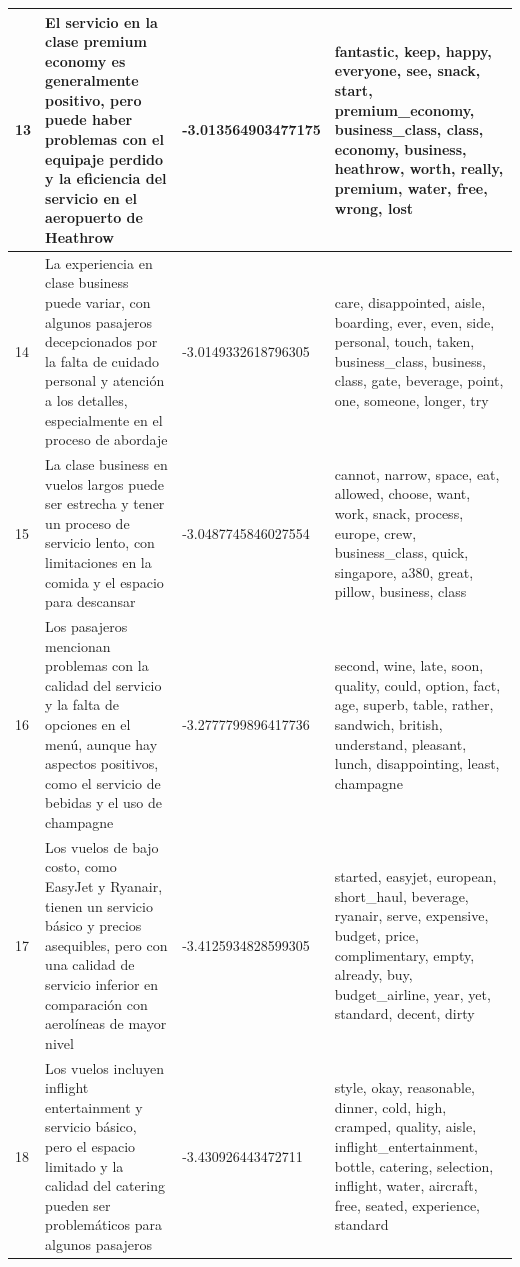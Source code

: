 \documentclass{report}
\begin{document}
\begin{longtable}{|p{1cm}|p{4cm}|p{4cm}|p{6cm}|}
                    \hline
                    13 & El servicio en la clase premium economy es generalmente positivo, pero puede haber problemas con el equipaje perdido y la eficiencia del servicio en el aeropuerto de Heathrow & -3.013564903477175 & fantastic, keep, happy, everyone, see, snack, start, premium\_economy, business\_class, class, economy, business, heathrow, worth, really, premium, water, free, wrong, lost \\
                    \hline
                    14 & La experiencia en clase business puede variar, con algunos pasajeros decepcionados por la falta de cuidado personal y atención a los detalles, especialmente en el proceso de abordaje & -3.0149332618796305 & care, disappointed, aisle, boarding, ever, even, side, personal, touch, taken, business\_class, business, class, gate, beverage, point, one, someone, longer, try \\
                    \hline
                    15 & La clase business en vuelos largos puede ser estrecha y tener un proceso de servicio lento, con limitaciones en la comida y el espacio para descansar & -3.0487745846027554 & cannot, narrow, space, eat, allowed, choose, want, work, snack, process, europe, crew, business\_class, quick, singapore, a380, great, pillow, business, class \\
                    \hline
                    16 & Los pasajeros mencionan problemas con la calidad del servicio y la falta de opciones en el menú, aunque hay aspectos positivos, como el servicio de bebidas y el uso de champagne & -3.2777799896417736 & second, wine, late, soon, quality, could, option, fact, age, superb, table, rather, sandwich, british, understand, pleasant, lunch, disappointing, least, champagne \\
                    \hline
                    17 & Los vuelos de bajo costo, como EasyJet y Ryanair, tienen un servicio básico y precios asequibles, pero con una calidad de servicio inferior en comparación con aerolíneas de mayor nivel & -3.4125934828599305 & started, easyjet, european, short\_haul, beverage, ryanair, serve, expensive, budget, price, complimentary, empty, already, buy, budget\_airline, year, yet, standard, decent, dirty \\
                    \hline
                    18 & Los vuelos incluyen inflight entertainment y servicio básico, pero el espacio limitado y la calidad del catering pueden ser problemáticos para algunos pasajeros & -3.430926443472711 & style, okay, reasonable, dinner, cold, high, cramped, quality, aisle, inflight\_entertainment, bottle, catering, selection, inflight, water, aircraft, free, seated, experience, standard \\

\end{longtable}
\end{document}
